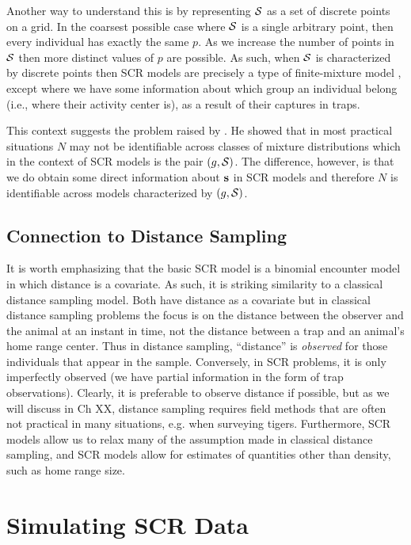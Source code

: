 Another way to understand this is by representing ${\cal S}$ as a set
of discrete points on a grid. In the coarsest possible case where
${\cal S}$ is a single arbitrary point, then every individual has
exactly the same $p$. As we increase the number of points in ${\cal
  S}$ then more distinct values of $p$ are possible. As such, when
${\cal S}$ is characterized by discrete points then SCR models are
precisely a type of finite-mixture model \citep{norris_pollock:1996,
  pledger:2000}, except where we have some information about which
group an individual belong (i.e., where their activity center is), as
a result of their captures in traps.

This context suggests the problem raised by \citet{link:2003}. He
showed that in most practical situations $N$ may not be identifiable
across classes of mixture distributions which in the context of SCR
models is the pair $(g, {\cal S})$.  The difference, however, is that
we do obtain some direct information about ${\bf s}$ in SCR models and
therefore $N$ is identifiable across models characterized by $(g,{\cal
  S})$.

\subsection{Connection to Distance Sampling}

It is worth emphasizing that the basic SCR model is a binomial
encounter model in which distance is a covariate. As such, it is
striking similarity to a classical distance sampling model. Both have
distance as a covariate but in classical distance sampling problems
the focus is on the distance between the observer and the animal at an
instant in time, not the distance between a trap and an animal's home
range center. Thus in distance sampling, ``distance'' is {\it
  observed} for those individuals that appear in the
sample. Conversely, in SCR problems, it is only imperfectly observed
(we have partial information in the form of trap observations).
Clearly, it is preferable to observe distance if possible, but as we
will discuss in Ch XX, distance sampling requires field methods that
are often not practical in many situations, e.g. when surveying
tigers. Furthermore, SCR models allow us to relax many of the
assumption made in classical distance sampling, and SCR models allow
for estimates of quantities other than density, such as home range
size.


\section{Simulating SCR Data}

